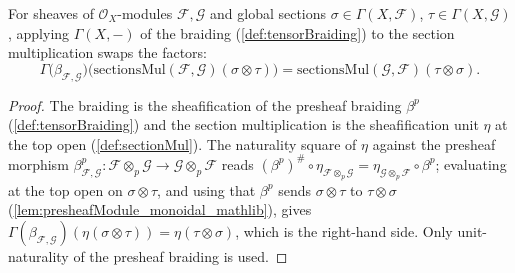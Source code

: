 \begin{lemma}
  \label{lem:sectionMul_braiding_core}
  For sheaves of \(\mathcal{O}_X\)-modules \(\mathcal{F}, \mathcal{G}\) and global
  sections \(\sigma \in \Gamma(X,\mathcal{F})\),
  \(\tau \in \Gamma(X,\mathcal{G})\), applying \(\Gamma(X,-)\) of the braiding
  (\cref{def:tensorBraiding}) to the section multiplication swaps the factors:
  \[
    \Gamma\bigl(\beta_{\mathcal{F},\mathcal{G}}\bigr)
      \bigl( \mathrm{sectionsMul}(\mathcal{F},\mathcal{G})(\sigma \otimes \tau)\bigr)
      = \mathrm{sectionsMul}(\mathcal{G},\mathcal{F})(\tau \otimes \sigma) .
  \]
\end{lemma}

\begin{proof}
  The braiding is the sheafification of the presheaf braiding \(\beta^p\)
  (\cref{def:tensorBraiding}) and the section multiplication is the
  sheafification unit \(\eta\) at the top open (\cref{def:sectionMul}). The
  naturality square of \(\eta\) against the presheaf morphism
  \(\beta^p_{\mathcal{F},\mathcal{G}} : \mathcal{F} \otimes_p \mathcal{G} \to
  \mathcal{G} \otimes_p \mathcal{F}\) reads
  \((\beta^p)^{\#} \circ \eta_{\mathcal{F} \otimes_p \mathcal{G}}
  = \eta_{\mathcal{G} \otimes_p \mathcal{F}} \circ \beta^p\); evaluating at the
  top open on \(\sigma \otimes \tau\), and using that \(\beta^p\) sends
  \(\sigma \otimes \tau\) to \(\tau \otimes \sigma\)
  (\cref{lem:presheafModule_monoidal_mathlib}), gives
  \(\Gamma(\beta_{\mathcal{F},\mathcal{G}})(\eta(\sigma \otimes \tau)) =
  \eta(\tau \otimes \sigma)\), which is the right-hand side. Only unit-naturality
  of the presheaf braiding is used.
\end{proof}

